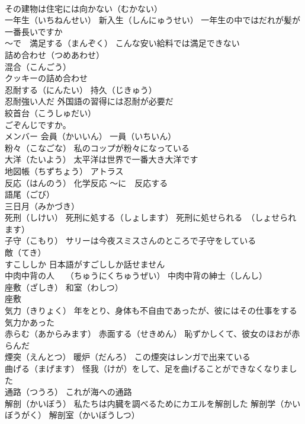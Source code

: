 \documentclass[8pt]{extreport}
\begin{document}
\begin{CJK}{UTF8}{min}
\\	その建物は住宅には向かない（むかない）
\\	一年生（いちねんせい） 新入生（しんにゅうせい） 一年生の中ではだれが髪が一番長いですか
\\	～で　満足する（まんぞく） こんな安い給料では満足できない
\\	詰め合わせ（つめあわせ）
\\	混合（こんごう）
\\	クッキーの詰め合わせ
\\	忍耐する（にんたい） 持久（じきゅう）
\\	忍耐強い人だ 外国語の習得には忍耐が必要だ
\\	絞首台（こうしゅだい）
\\	ごぞんじですか。
\\	メンバー 会員（かいいん） 一員（いちいん）
\\	粉々（こなごな） 私のコップが粉々になっている
\\	大洋（たいよう） 太平洋は世界で一番大き大洋です
\\	地図帳（ちずちょう） アトラス
\\	反応（はんのう） 化学反応 ～に　反応する
\\	語尾（ごび）
\\	三日月（みかづき）
\\	死刑（しけい） 死刑に処する（しょします） 死刑に処せられる　（しょせられます）
\\	子守（こもり） サリーは今夜スミスさんのところで子守をしている
\\	敵（てき）
\\	すこししか 日本語がすごししか話せません
\\	中肉中背の人　 （ちゅうにくちゅうぜい） 中肉中背の紳士（しんし）
\\	座敷（ざしき） 和室（わしつ） 
\\	座敷 
\\	気力（きりょく） 年をとり、身体も不自由であったが、彼にはその仕事をする気力かあった
\\	赤らむ（あからみます） 赤面する（せきめん） 恥ずかしくて、彼女のほおが赤らんだ
\\	煙突（えんとつ） 暖炉（だんろ） この煙突はレンガで出来ている
\\	曲げる（まげます） 怪我（けが）をして、足を曲げることができなくなりました
\\	通路（つうろ） これが海への通路
\\	解剖（かいぼう） 私たちは内臓を調べるためにカエルを解剖した 解剖学（かいぼうがく） 解剖室（かいぼうしつ）

\end{CJK}
\end{document}
